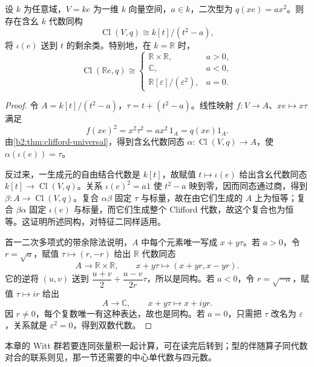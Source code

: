 \begin{proposition}\label{b2:prop:clifford-line-models}
	设 \(k\) 为任意域，\(V=ke\) 为一维 \(k\) 向量空间，\(a\in k\)，二次型为 \(q(xe)=ax^2\)。则存在含幺 \(k\) 代数同构
	\[
		\operatorname{Cl}(V,q)\cong k[t]/(t^2-a),
	\]
	将 \(\iota(e)\) 送到 \(t\) 的剩余类。特别地，在 \(k=\mathbb R\) 时，
	\[
		\operatorname{Cl}(\mathbb R e,q)\cong
		\begin{cases}
			\mathbb R\times\mathbb R,&a>0,\\
			\mathbb C,&a<0,\\
			\mathbb R[\varepsilon]/(\varepsilon^2),&a=0.
		\end{cases}
	\]
\end{proposition}
\begin{proof}
	令 \(A=k[t]/(t^2-a)\)，\(\tau=t+(t^2-a)\)。线性映射 \(f:V\to A\)、\(xe\mapsto x\tau\) 满足
	\[
		f(xe)^2=x^2\tau^2=ax^2\,1_A=q(xe)1_A.
	\]
	由\cref{b2:thm:clifford-universal}，得到含幺代数同态 \(\alpha:\operatorname{Cl}(V,q)\to A\)，使 \(\alpha(\iota(e))=\tau\)。

	反过来，一生成元的自由结合代数是 \(k[t]\)，故赋值 \(t\mapsto\iota(e)\) 给出含幺代数同态 \(k[t]\to\operatorname{Cl}(V,q)\)。关系 \(\iota(e)^2=a1\) 使 \(t^2-a\) 映到零，因而同态通过商，得到 \(\beta:A\to\operatorname{Cl}(V,q)\)。复合 \(\alpha\beta\) 固定 \(\tau\) 与标量，故在由它们生成的 \(A\) 上为恒等；复合 \(\beta\alpha\) 固定 \(\iota(e)\) 与标量，而它们生成整个 Clifford 代数，故这个复合也为恒等。这证明所述同构，对特征二同样适用。

	首一二次多项式的带余除法说明，\(A\) 中每个元素唯一写成 \(x+y\tau\)。若 \(a>0\)，令 \(r=\sqrt a\)，赋值 \(\tau\mapsto(r,-r)\) 给出 \(\mathbb R\) 代数同态
	\[
		A\longrightarrow\mathbb R\times\mathbb R,\qquad x+y\tau\longmapsto(x+yr,x-yr).
	\]
	它的逆将 \((u,v)\) 送到 \(\dfrac{u+v}2+\dfrac{u-v}{2r}\tau\)，所以是同构。若 \(a<0\)，令 \(r=\sqrt{-a}\)，赋值 \(\tau\mapsto ir\) 给出
	\[
		A\longrightarrow\mathbb C,\qquad x+y\tau\longmapsto x+iyr.
	\]
	因 \(r\ne0\)，每个复数唯一有这种表达，故也是同构。若 \(a=0\)，只需把 \(\tau\) 改名为 \(\varepsilon\)，关系就是 \(\varepsilon^2=0\)，得到双数代数。
\end{proof}

本章的 Witt 群若要连同张量积一起计算，可在读完后转到；型的伴随算子同代数对合的联系则见，那一节还需要的中心单代数与四元数。
